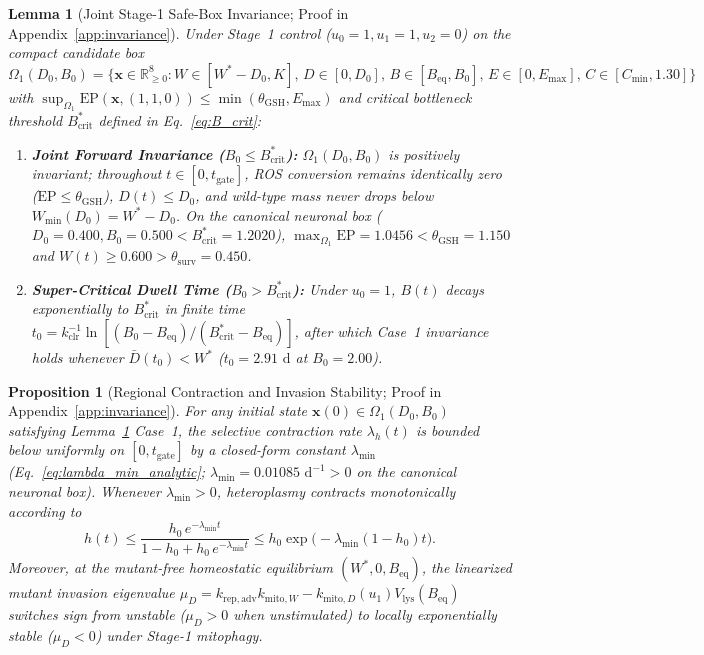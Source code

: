 \documentclass[11pt]{article}
\theoremstyle{plain}
\newtheorem{lemma}{Lemma}
\newtheorem{proposition}{Proposition}
\theoremstyle{remark}
\begin{document}
\begin{lemma}[Joint Stage-1 Safe-Box Invariance; Proof in Appendix~\ref{app:invariance}]
\label{lem:invariance}
Under Stage~1 control ($u_0 = 1, u_1 = 1, u_2 = 0$) on the compact candidate box $\Omega_1(D_0, B_0) = \{\mathbf{x} \in \mathbb{R}_{\ge 0}^8 : W \in [W^* - D_0, K],\, D \in [0, D_0],\, B \in [B_{\mathrm{eq}}, B_0],\, E \in [0, E_{\max}],\, C \in [C_{\min}, 1.30]\}$ with $\sup_{\Omega_1} \mathrm{EP}(\mathbf{x}, (1,1,0)) \le \min(\theta_{\mathrm{GSH}}, E_{\max})$ and critical bottleneck threshold $B_{\mathrm{crit}}^*$ defined in Eq.~\eqref{eq:B_crit}:
\begin{enumerate}
  \item \textbf{Joint Forward Invariance ($B_0 \le B_{\mathrm{crit}}^*$):} $\Omega_1(D_0, B_0)$ is positively invariant; throughout $t \in [0, t_{\mathrm{gate}}]$, ROS conversion remains identically zero ($\mathrm{EP} \le \theta_{\mathrm{GSH}}$), $D(t) \le D_0$, and wild-type mass never drops below $W_{\min}(D_0) = W^* - D_0$. On the canonical neuronal box ($D_0 = 0.400, B_0 = 0.500 < B_{\mathrm{crit}}^* = 1.2020$), $\max_{\Omega_1}\mathrm{EP} = 1.0456 < \theta_{\mathrm{GSH}} = 1.150$ and $W(t) \ge 0.600 > \theta_{\mathrm{surv}} = 0.450$.
  \item \textbf{Super-Critical Dwell Time ($B_0 > B_{\mathrm{crit}}^*$):} Under $u_0 = 1$, $B(t)$ decays exponentially to $B_{\mathrm{crit}}^*$ in finite time $t_0 = k_{\mathrm{clr}}^{-1}\ln[(B_0 - B_{\mathrm{eq}})/(B_{\mathrm{crit}}^* - B_{\mathrm{eq}})]$, after which Case~1 invariance holds whenever $\bar{D}(t_0) < W^*$ ($t_0 = 2.91\text{ d}$ at $B_0 = 2.00$).
\end{enumerate}
\end{lemma}

\begin{proposition}[Regional Contraction and Invasion Stability; Proof in Appendix~\ref{app:invariance}]
\label{prop:stability}
For any initial state $\mathbf{x}(0) \in \Omega_1(D_0, B_0)$ satisfying Lemma~\ref{lem:invariance} Case~1, the selective contraction rate $\lambda_h(t)$ is bounded below uniformly on $[0, t_{\mathrm{gate}}]$ by a closed-form constant $\lambda_{\min}$ (Eq.~\ref{eq:lambda_min_analytic}; $\lambda_{\min} = 0.01085\text{ d}^{-1} > 0$ on the canonical neuronal box). Whenever $\lambda_{\min} > 0$, heteroplasmy contracts monotonically according to
\begin{equation}
  h(t) \le \frac{h_0\,e^{-\lambda_{\min} t}}{1 - h_0 + h_0\,e^{-\lambda_{\min} t}} \le h_0\exp\!\big(-\lambda_{\min}(1 - h_0)t\big).
  \label{eq:prop1_bounds}
\end{equation}
Moreover, at the mutant-free homeostatic equilibrium $(W^*, 0, B_{\mathrm{eq}})$, the linearized mutant invasion eigenvalue $\mu_D = k_{\mathrm{rep,adv}}k_{\mathrm{mito},W} - k_{\mathrm{mito},D}(u_1)V_{\mathrm{lys}}(B_{\mathrm{eq}})$ switches sign from unstable ($\mu_D > 0$ when unstimulated) to locally exponentially stable ($\mu_D < 0$) under Stage-1 mitophagy.
\end{proposition}
\end{document}
